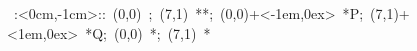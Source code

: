 

\hbox{
\xy    <1cm,0cm>:<0cm,-1cm>::
       (0,0) ; (7,1) **\dir{-}; 
       (0,0)+<-1em,0ex> *{P};
       (7,1)+<1em,0ex> *{Q};
	(0,0) *{\bullet};
	(7,1) *{\bullet}
       \endxy}
	   

